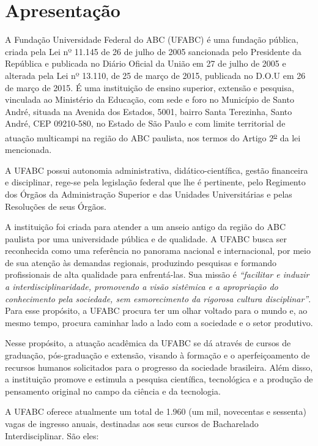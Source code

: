 \section {Apresentação}

A Fundação Universidade Federal do ABC (UFABC) é uma fundação pública, criada pela Lei nº 11.145 de 26 de julho de 2005 sancionada pelo Presidente da República e publicada no Diário Oficial da União em 27 de julho de 2005 e alterada pela Lei nº 13.110, de 25 de março de 2015, publicada no D.O.U em 26 de março de 2015. É uma instituição de ensino superior, extensão e pesquisa, vinculada ao Ministério da Educação, com sede e foro no Município de Santo André, situada na Avenida dos Estados, 5001, bairro Santa Terezinha, Santo André, CEP 09210-580, no Estado de São Paulo e com limite territorial de atuação multicampi na região do ABC paulista, nos termos do Artigo 2\textsuperscript{\underline{o}} da lei mencionada.

A UFABC possui autonomia administrativa, didático-científica, gestão financeira e
disciplinar, rege-se pela legislação federal que lhe é pertinente, pelo Regimento dos Órgãos da Administração Superior e das Unidades Universitárias e pelas Resoluções de seus Órgãos.

A instituição foi criada para atender a um anseio antigo da região do ABC paulista por uma universidade pública e de qualidade. A UFABC busca ser reconhecida como uma referência no panorama nacional e internacional, por meio de sua atenção às demandas regionais, produzindo pesquisas e formando profissionais de alta qualidade para enfrentá-las. Sua missão é \textit{``facilitar e induzir a interdisciplinaridade, promovendo a visão sistêmica e a apropriação do conhecimento pela sociedade, sem esmorecimento da rigorosa cultura disciplinar''}. Para esse propósito, a UFABC procura ter um olhar voltado para o mundo e, ao mesmo tempo, procura caminhar lado a lado com a sociedade e o setor produtivo.

Nesse propósito, a atuação acadêmica da UFABC se dá através de cursos de graduação, pós-graduação e extensão, visando à formação e o aperfeiçoamento de recursos humanos solicitados para o progresso da sociedade brasileira. Além disso, a instituição promove e estimula a pesquisa científica, tecnológica e a produção de pensamento original no campo da ciência e da tecnologia.

A UFABC oferece atualmente um total de 1.960 (um mil, novecentas e sessenta) vagas de ingresso anuais, destinadas aos seus cursos de Bacharelado Interdisciplinar. São eles:

